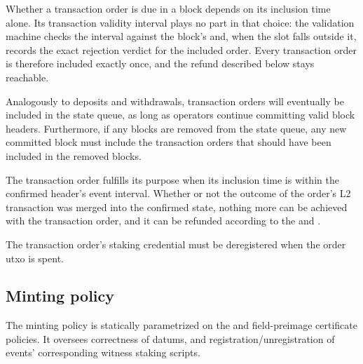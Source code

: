 \documentclass[../midgard.tex]{subfiles}
\begin{document}
Whether a transaction order is due in a block depends on its inclusion time alone.
Its transaction validity interval plays no part in that choice: the validation machine checks the interval against the block's  and, when the slot falls outside it, records the exact rejection verdict for the included order.
Every transaction order is therefore included exactly once, and the refund described below stays reachable.

Analogously to deposits and withdrawals, transaction orders will eventually be included in the state queue, as long as operators continue committing valid block headers.
Furthermore, if any blocks are removed from the state queue, any new committed block must include the transaction orders that should have been included in the removed blocks.

The transaction order fulfills its purpose when its inclusion time is within the confirmed header's event interval.
Whether or not the outcome of the order's L2 transaction was merged into the confirmed state, nothing more can be achieved with the transaction order, and it can be refunded according to the  and .

The transaction order's  staking credential must be deregistered when the order utxo is spent.

\subsection{Minting policy}
\label{h:transaction-order-minting-policy}

The  minting policy is statically parametrized on the  and field-preimage certificate policies.
It oversees correctness of datums, and registration/unregistration of events' corresponding witness staking scripts.
\end{document}
